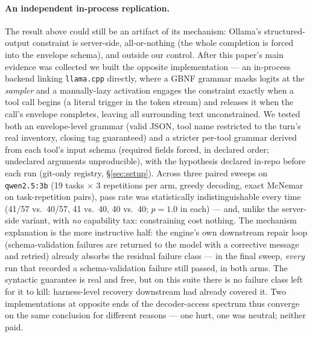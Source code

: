 \documentclass[smallcondensed,natbib]{svjour3}
\begin{document}
\paragraph{An independent in-process replication.} The result above
could still be an artifact of its mechanism: Ollama's structured-output
constraint is server-side, all-or-nothing (the whole completion is
forced into the envelope schema), and outside our control. After this
paper's main evidence was collected we built the opposite
implementation --- an in-process backend linking \texttt{llama.cpp}
directly, where a GBNF grammar masks logits at the \emph{sampler} and a
manually-lazy activation engages the constraint exactly when a tool
call begins (a literal trigger in the token stream) and releases it
when the call's envelope completes, leaving all surrounding text
unconstrained. We tested both an envelope-level grammar (valid JSON,
tool name restricted to the turn's real inventory, closing tag
guaranteed) and a stricter per-tool grammar derived from each tool's
input schema (required fields forced, in declared order; undeclared
arguments unproducible), with the hypothesis declared in-repo before
each run (git-only registry, \S\ref{sec:setup}). Across three paired
sweeps on \texttt{qwen2.5:3b} (19 tasks $\times$ 3 repetitions per arm,
greedy decoding, exact McNemar on task-repetition pairs), pass rate was
statistically indistinguishable every time (41/57 vs.\ 40/57, 41 vs.\
40, 40 vs.\ 40; $p{=}1.0$ in each) --- and, unlike the server-side
variant, with \emph{no} capability tax: constraining cost nothing. The
mechanism explanation is the more instructive half: the engine's own
downstream repair loop (schema-validation failures are returned to the
model with a corrective message and retried) already absorbs the
residual failure class --- in the final sweep, \emph{every} run that
recorded a schema-validation failure still passed, in both arms. The
syntactic guarantee is real and free, but on this suite there is no
failure class left for it to kill: harness-level recovery downstream
had already covered it. Two implementations at opposite ends of the
decoder-access spectrum thus converge on the same conclusion for
different reasons --- one hurt, one was neutral; neither paid.
\end{document}
